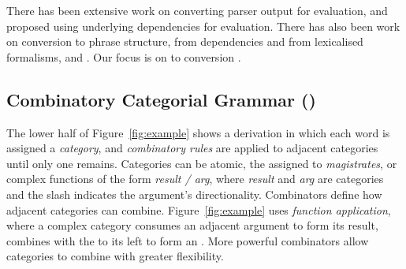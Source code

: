 There has been extensive work on converting parser output for evaluation, \myeg
\textcite{Lin:1998} and \textcite{Briscoe-Carroll-Graham-Copestake:2002} proposed
using underlying dependencies for evaluation.  There has also been work on
conversion to phrase structure, from dependencies \parencite{Xia:2001,Xia:2009} and
from lexicalised formalisms, \myeg \hpsg \parencite{Matsuzaki-Tsujii:2008} and \mytag
\parencite{Chiang:2000,Sarkar:2001}. Our focus is on \ccg to \ptb conversion
\parencite{Clark-Curran:2009}.

\subsection{Combinatory Categorial Grammar (\ccg)}

The lower half of Figure~\ref{fig:example} shows a \ccg derivation
\parencite{Steedman:2000} in which each word is assigned a {\em category}, and
{\em combinatory rules} are applied to adjacent categories until only one
remains.  Categories can be atomic, \myeg the  assigned to
\textit{magistrates}, or complex functions of the form {\em result / arg}, where
{\em result} and {\em arg} are categories and the slash indicates the argument's
directionality.  Combinators define how adjacent categories can combine.
Figure~\ref{fig:example} uses {\em function application}, where a complex
category consumes an adjacent argument to form its result, \myeg {} combines with the  to its left to form an .  More
powerful combinators allow categories to combine with greater flexibility.

